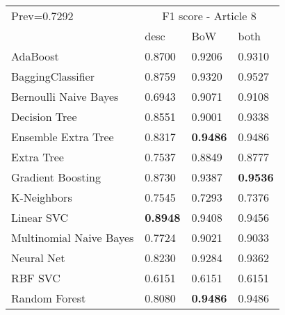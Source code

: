 \begin{tabular}{|l|l|l|l| }
\hline
Prev=0.7292 &  \multicolumn{3}{c|}{F1 score - Article 8} \\
\cline{2-4} & desc & BoW & both \\ \hline
AdaBoost                & 0.8700 & 0.9206 & 0.9310\\
BaggingClassifier       & 0.8759 & 0.9320 & 0.9527\\
Bernoulli Naive Bayes   & 0.6943 & 0.9071 & 0.9108\\
Decision Tree           & 0.8551 & 0.9001 & 0.9338\\
Ensemble Extra Tree     & 0.8317 & {\bf 0.9486} & 0.9486\\
Extra Tree              & 0.7537 & 0.8849 & 0.8777\\
Gradient Boosting       & 0.8730 & 0.9387 & {\bf 0.9536}\\
K-Neighbors             & 0.7545 & 0.7293 & 0.7376\\
Linear SVC              & {\bf 0.8948} & 0.9408 & 0.9456\\
Multinomial Naive Bayes & 0.7724 & 0.9021 & 0.9033\\
Neural Net              & 0.8230 & 0.9284 & 0.9362\\
RBF SVC                 & 0.6151 & 0.6151 & 0.6151\\
Random Forest           & 0.8080 & {\bf 0.9486} & 0.9486\\
\hline
\end{tabular}